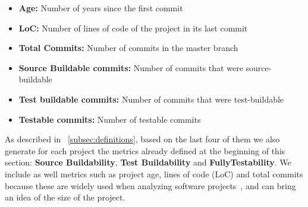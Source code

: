 \begin{itemize}
    \item \textbf{Age:} Number of years since the first commit
    \item \textbf{LoC:} Number of lines of code of the project in its last commit
    \item \textbf{Total Commits:} Number of commits in the master branch
    \item \textbf{Source Buildable commits:} Number of commits that were source-buildable
    \item \textbf{Test buildable commits:} Number of commits that were test-buildable
    \item \textbf{Testable commits:} Number of testable commits
\end{itemize}


As described in ~\ref{subsec:definitions}, based on the last four of them we also generate for each project the metrics already defined at the beginning of this section: \textbf{Source Buildability}, \textbf{Test Buildability} and \textbf{FullyTestability}.
We include as well metrics such as project age, lines of code (LoC) and total commits because these are widely used when analyzing software projects~\cite{yamashita2015revisiting,mannan2016understanding,rosen2015commit}, and can bring an idea of the size of the project. 


